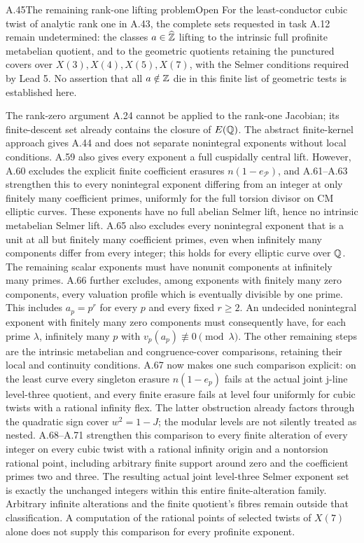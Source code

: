 \begin{statement}{A.45}{The remaining rank-one lifting problem}{Open}
For the least-conductor cubic twist of analytic rank one in A.43,
the complete sets requested in task A.12 remain undetermined: the
classes $a\in\widehat{\mathbb Z}$ lifting to the intrinsic full profinite
metabelian quotient, and to the geometric quotients retaining the
punctured covers over $X(3),X(4),X(5),X(7)$, with the Selmer conditions
required by Lead 5. No assertion that all $a\notin\mathbb Z$ die in this
finite list of geometric tests is established here.
\end{statement}
The rank-zero argument A.24 cannot be applied to the rank-one
Jacobian; its finite-descent set already contains the closure of
$E(\mathbb Q)$. The abstract finite-kernel approach gives A.44 and does
not separate nonintegral exponents without local conditions.
A.59 also gives every exponent a full cuspidally central lift.
However, A.60 excludes the explicit finite coefficient erasures
$n(1-e_{\mathcal P})$, and A.61--A.63 strengthen this to every
nonintegral exponent differing from an integer at only finitely
many coefficient primes, uniformly for the full torsion divisor
on CM elliptic curves. These exponents have no full abelian Selmer
lift, hence no intrinsic metabelian Selmer lift. A.65 also excludes
every nonintegral exponent that is a unit at all but finitely many
coefficient primes, even when infinitely many components differ
from every integer; this holds for every elliptic curve over $\mathbb Q$.
The remaining scalar exponents must have nonunit components at
infinitely many primes. A.66 further excludes, among exponents
with finitely many zero components, every valuation profile which
is eventually divisible by one prime. This includes
$a_p=p^r$ for every $p$ and every fixed $r\ge2$.
An undecided nonintegral exponent with finitely many zero
components must consequently have, for each prime $\lambda$,
infinitely many $p$ with $v_p(a_p)\not\equiv0\pmod\lambda$.
The other remaining steps are the intrinsic
metabelian and congruence-cover comparisons, retaining their local
and continuity conditions. A.67 now makes one such comparison
explicit: on the least curve every singleton erasure
$n(1-e_p)$ fails at the actual joint j-line level-three
quotient, and every finite erasure fails at level four
uniformly for cubic twists with a rational infinity flex.
The latter obstruction already factors through the
quadratic sign cover $w^2=1-J$; the modular levels are
not silently treated as nested. A.68--A.71 strengthen
this comparison to every finite alteration of every
integer on every cubic twist with a rational infinity
origin and a nontorsion rational point, including
arbitrary finite support around zero and the coefficient
primes two and three. The resulting actual joint level-three
Selmer exponent set is exactly the unchanged integers within
this entire finite-alteration family. Arbitrary
infinite alterations and the finite quotient's
fibres remain outside that classification.
A computation
of the rational points of selected twists of $X(7)$ alone does not
supply this comparison for every profinite exponent.
